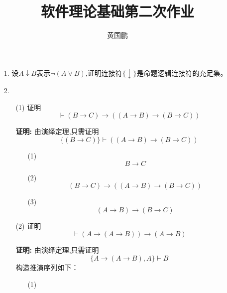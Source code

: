 \documentclass[11pt,oneside,a4paper]{article}
\author{黄国鹏}
\title{软件理论基础第二次作业 }
\begin{document}
\maketitle
\begin{itemize}
    \item[1.] 设$A \downarrow B $表示$\neg (A \vee B)$,证明连接符$\{ \downarrow \}$是命题逻辑连接符的充足集。
    \item[2.] 
        \begin{itemize}
            \item[(1)] 证明\[ \vdash (B \to C) \to ((A \to B) \to (B \to C))\] \par
            \textbf{证明:} \quad 由演绎定理,只需证明
                            \begin{equation*}
                               \{ (B \to C) \}  \vdash ((A \to B) \to (B \to C))
                            \end{equation*}
            \begin{itemize}
                \item[(1)]  
                            \begin{equation*}
                                B \to C                      \tag*{$\varGamma$}
                            \end{equation*}
                \item[(2)] 
                            \begin{equation*}
                               (B \to C) \to ((A \to B) \to (B \to C))  \tag*{L2}
                            \end{equation*}
                \item[(3)]
                            \begin{equation*}
                                (A \to B) \to (B \to C)      \tag*{MP(1,2)}
                            \end{equation*}
            \end{itemize}
            \item[(2)] 证明\[ \vdash (A \to (A \to B)) \to (A \to B)\] \par
            \textbf{证明:} \quad 由演绎定理,只需证明
                        \begin{equation*}
                            \{ A \to (A \to B),A \} \vdash B
                        \end{equation*}
            构造推演序列如下：            
            \begin{itemize}    
                \item[(1)] \begin{equation*}

\end{equation*}
\end{itemize}
\end{itemize}
\end{itemize}
\end{document}
